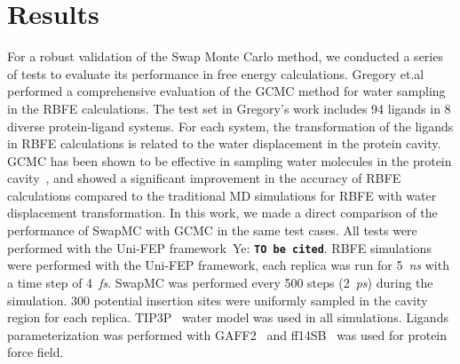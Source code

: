 \documentclass[journal=jacsat,manuscript=article]{achemso}
\newcommand*\YE[1]{Ye: \texttt{\textbf{#1}}}
\begin{document}
\section{Results}
For a robust validation of the Swap Monte Carlo method, 
we conducted a series of tests to evaluate its performance in free energy calculations.
Gregory et.al~\cite{ross2020enhancing} performed a comprehensive evaluation of the GCMC method for water sampling in the RBFE calculations.
The test set in Gregory's work includes 94 ligands in 8 diverse protein-ligand systems.
For each system, the transformation of the ligands in RBFE calculations is related to the water displacement in the protein cavity.
GCMC has been shown to be effective in sampling water molecules in the protein cavity~\cite{ross2015water},
and showed a significant improvement in the accuracy of RBFE calculations compared to the traditional MD simulations for RBFE with water displacement transformation.
In this work, we made a direct comparison of the performance of SwapMC with GCMC in the same test cases.
All tests were performed with the Uni-FEP framework~\YE{TO be cited}.
RBFE simulations were performed with the Uni-FEP framework, 
each replica was run for 5~\textit{ns} with a time step of 4~\textit{fs}.
SwapMC was performed every 500 steps (2~\textit{ps}) during the simulation.
300 potential insertion sites were uniformly sampled in the cavity region for each replica.
TIP3P~\cite{Jorgensen1983} water model was used in all simulations.
Ligands parameterization was performed with GAFF2~\cite{he2020fast} and ff14SB~\cite{Maier2015} was used for protein force field.
\end{document}

